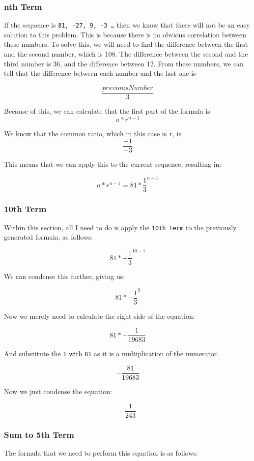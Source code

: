 \documentclass[a4paper,12pt]{article}
\begin{document}
\subsubsection{nth Term}
If the sequence is \texttt{81, -27, 9, -3 \ldots} then we know that there will not be an easy solution to this problem. This is because there is no obvious correlation between these numbers. To solve this, we will need to find the difference between the first and the second number, which is \textsc{108}. The difference between the second and the third number is \textsc{36}, and the difference between \textsc{12}. From these numbers, we can tell that the difference between each number and the last one is

\[
  \frac{previousNumber}{3}
\]

Because of this, we can calculate that the first part of the formula is
\[
  a * r^{n-1}
\]

We know that the common ratio, which in this case is \texttt{r}, is
\[
  \frac{-1}{-3}
\]

This means that we can apply this to the current sequence, resulting in:

\[
  a * r^{n-1} = 81 * \frac{1}{3}^{n-1}
\]

\newpage

\subsubsection{10th Term}
Within this section, all I need to do is apply the \texttt{10th term} to the previously generated formula, as follows:

\[
  81 * -\frac{1}{3}^{10-1}
\]

We can condense this further, giving us:

\[
  81 * -\frac{1}{3}^{9}
\]

Now we merely need to calculate the right side of the equation:

\[
  81 * -\frac{1}{19683}
\]

And substitute the \texttt{1} with \texttt{81} as it is a multiplication of the numerator.

\[
  -\frac{81}{19683}
\]

Now we just condense the equation:

\[
  -\frac{1}{243}
\]

\subsubsection{Sum to 5th Term}
The formula that we need to perform this equation is as follows:
\end{document}
